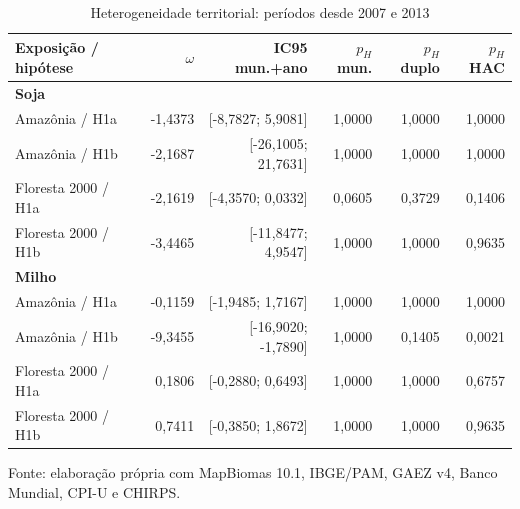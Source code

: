 \begin{table}[htbp]
\centering
\footnotesize
\setlength{\tabcolsep}{3pt}
\renewcommand{\arraystretch}{1.1}
\normalcaption\captionstyle{\centering}
\caption{Heterogeneidade territorial: períodos desde 2007 e 2013}
\label{tab:h1-instituicoes-principal}
\begin{tabular}{lrrrrr}
\hline
Exposição / hipótese & $\omega$ & IC95 mun.+ano & $p_H$ mun. & $p_H$ duplo & $p_H$ HAC \\
\hline\multicolumn{6}{l}{\textbf{Soja}} \\
Amazônia / H1a & -1,4373 & [-8,7827; 5,9081] & 1,0000 & 1,0000 & 1,0000 \\
Amazônia / H1b & -2,1687 & [-26,1005; 21,7631] & 1,0000 & 1,0000 & 1,0000 \\
Floresta 2000 / H1a & -2,1619 & [-4,3570; 0,0332] & 0,0605 & 0,3729 & 0,1406 \\
Floresta 2000 / H1b & -3,4465 & [-11,8477; 4,9547] & 1,0000 & 1,0000 & 0,9635 \\
\hline\multicolumn{6}{l}{\textbf{Milho}} \\
Amazônia / H1a & -0,1159 & [-1,9485; 1,7167] & 1,0000 & 1,0000 & 1,0000 \\
Amazônia / H1b & -9,3455 & [-16,9020; -1,7890] & 1,0000 & 0,1405 & 0,0021 \\
Floresta 2000 / H1a & 0,1806 & [-0,2880; 0,6493] & 1,0000 & 1,0000 & 0,6757 \\
Floresta 2000 / H1b & 0,7411 & [-0,3850; 1,8672] & 1,0000 & 1,0000 & 0,9635 \\
\hline\end{tabular}
\par\smallskip
\begin{minipage}{\textwidth}\footnotesize\centering
Fonte: elaboração própria com MapBiomas 10.1, IBGE/PAM, GAEZ v4, Banco Mundial, CPI-U e CHIRPS.
\end{minipage}
\end{table}
